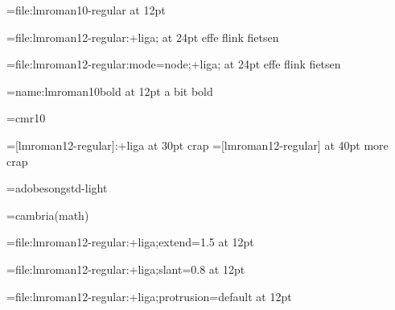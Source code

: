 


%
%


\font\testa=file:lmroman10-regular                  at 12pt \testa  \par
\font\testb=file:lmroman12-regular:+liga;           at 24pt \testb effe flink fietsen \par
\font\testc=file:lmroman12-regular:mode=node;+liga; at 24pt \testc effe flink fietsen \par
\font\testd=name:lmroman10bold                      at 12pt \testd a bit bold \par

\font\oeps=cmr10

\font\oeps=[lmroman12-regular]:+liga at 30pt \oeps crap
\font\oeps=[lmroman12-regular]       at 40pt \oeps more crap

\font\cidtest=adobesongstd-light

\font\mathtest=cambria(math) {}


\bgroup

    \ifdefined\pdfprotrudechars \pdfprotrudechars \else \protrudechars {} \relax
    \ifdefined\pdfadjustspacing \pdfadjustspacing \else \adjustspacing {} \relax

    \font\testb=file:lmroman12-regular:+liga;extend=1.5         at 12pt \testb  \par
    \font\testb=file:lmroman12-regular:+liga;slant=0.8          at 12pt \testb  \par
    \font\testb=file:lmroman12-regular:+liga;protrusion=default at 12pt \testb  \par

\egroup


